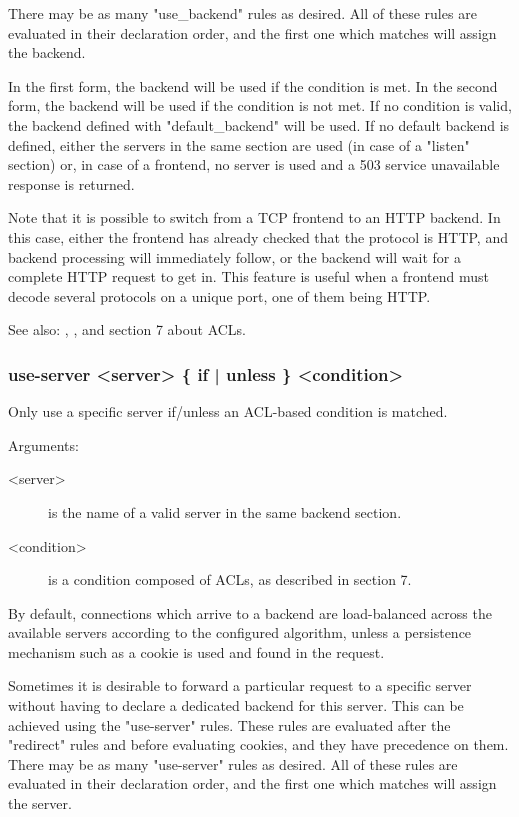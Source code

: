   There may be as many "use\_backend" rules as desired. All of these rules are
  evaluated in their declaration order, and the first one which matches will
  assign the backend.

  In the first form, the backend will be used if the condition is met. In the
  second form, the backend will be used if the condition is not met. If no
  condition is valid, the backend defined with "default\_backend" will be used.
  If no default backend is defined, either the servers in the same section are
  used (in case of a "listen" section) or, in case of a frontend, no server is
  used and a 503 service unavailable response is returned.

  Note that it is possible to switch from a TCP frontend to an HTTP backend. In
  this case, either the frontend has already checked that the protocol is HTTP,
  and backend processing will immediately follow, or the backend will wait for
  a complete HTTP request to get in. This feature is useful when a frontend
  must decode several protocols on a unique port, one of them being HTTP.

  See also: , , and section 7 about ACLs.

\subsubsection[use-server]{use-server <server> \{ if | unless \} <condition>}

  Only use a specific server if/unless an ACL-based condition is matched.


  Arguments:
  \begin{description}
  \item[<server>] is the name of a valid server in the same backend section.
  \item[<condition>] is a condition composed of ACLs, as described in section 7.
  \end{description}

  By default, connections which arrive to a backend are load-balanced across
  the available servers according to the configured algorithm, unless a
  persistence mechanism such as a cookie is used and found in the request.

  Sometimes it is desirable to forward a particular request to a specific
  server without having to declare a dedicated backend for this server. This
  can be achieved using the "use-server" rules. These rules are evaluated after
  the "redirect" rules and before evaluating cookies, and they have precedence
  on them. There may be as many "use-server" rules as desired. All of these
  rules are evaluated in their declaration order, and the first one which
  matches will assign the server.

